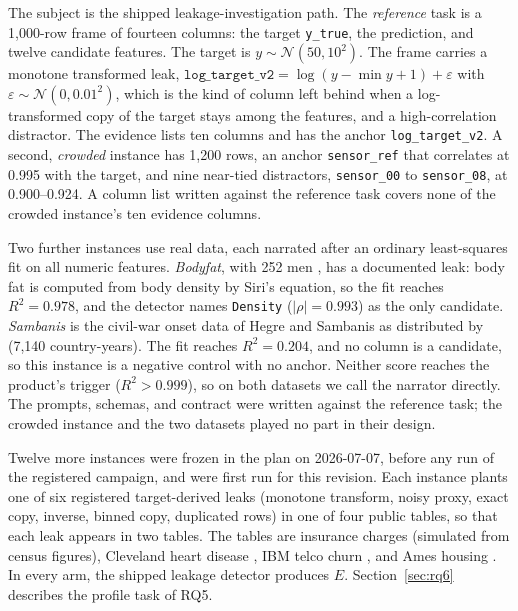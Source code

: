 \documentclass[10pt,twocolumn]{article}
\begin{document}
The subject is the shipped leakage-investigation path. The \emph{reference}
task is a 1,000-row frame of fourteen columns: the target \texttt{y\_true},
the prediction, and twelve candidate features. The target is
$y\sim\mathcal{N}(50,10^2)$. The frame carries a monotone transformed leak,
$\texttt{log\_target\_v2}=\log(y-\min y+1)+\varepsilon$ with
$\varepsilon\sim\mathcal{N}(0,0.01^2)$, which is the kind of column left behind
when a log-transformed copy of the target stays among the features, and a
high-correlation distractor. The evidence lists ten columns and has the
anchor \texttt{log\_target\_v2}. A second, \emph{crowded} instance has 1,200
rows, an anchor \texttt{sensor\_ref} that correlates at 0.995 with the target,
and nine near-tied distractors, \texttt{sensor\_00} to \texttt{sensor\_08}, at
0.900--0.924. A column list written against the reference task covers none of
the crowded instance's ten evidence columns.

Two further instances use real data, each narrated after an ordinary
least-squares fit on all numeric features. \emph{Bodyfat}, with 252
men \citep{penrose1985bodyfat}, has a documented leak: body fat is computed from
body density by Siri's equation, so the fit reaches $R^2=0.978$, and the
detector names \texttt{Density} ($|\rho|=0.993$) as the only candidate.
\emph{Sambanis} is the civil-war onset data of Hegre and Sambanis as
distributed by \citet{muchlinski2016civilwar} (7{,}140
country-years). The fit reaches $R^2=0.204$, and no column is a candidate, so
this instance is a negative control with no anchor. Neither score reaches the
product's trigger ($R^2>0.999$), so on both datasets we call the narrator
directly. The prompts, schemas, and contract were written against the
reference task; the crowded instance and the two datasets played no part in
their design.

Twelve more instances were frozen in the plan on 2026-07-07, before any run
of the registered campaign, and were first run for this revision. Each instance plants one of six
registered target-derived leaks (monotone transform, noisy proxy, exact copy,
inverse, binned copy, duplicated rows) in one of four public tables, so that
each leak appears in two tables. The tables are insurance
charges \citep{lantz2013mlr} (simulated from census figures), Cleveland heart
disease \citep{janosi1988heart}, IBM telco churn \citep{ibm2019telco}, and Ames
housing \citep{decock2011ames}. In every arm, the shipped leakage detector
produces $E$. Section~\ref{sec:rq6} describes the profile task of RQ5.
\end{document}
